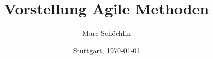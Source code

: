 \documentclass[10pt,compress]{beamer}
\title{Vorstellung Agile Methoden}
\author{Marc Schöchlin}
\institute[]{%
  ms-github@256bit.org
  }
\date{Stuttgart, \today}
\begin{document}
\frame{\titlepage}






\end{document}
